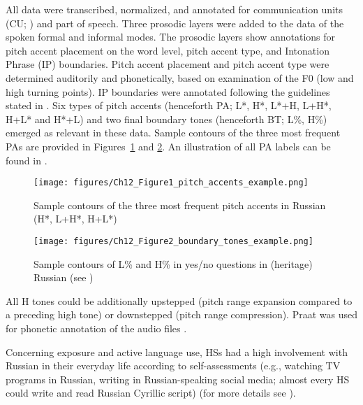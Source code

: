 \documentclass[output=paper,colorlinks,citecolor=brown]{langscibook}
\begin{document}
All data were transcribed, normalized, and annotated for communication units (CU; \cite{Hughes_McGillivray_Schmidek_1997}) and part of speech. Three prosodic layers were added to the data of the spoken formal and informal modes. The prosodic layers show annotations for pitch accent placement on the word level, pitch accent type, and Intonation Phrase (IP) boundaries. Pitch accent placement and pitch accent type were determined auditorily and phonetically, based on examination of the F0 (low and high turning points). IP boundaries were annotated following the guidelines stated in \citet{Himmelmann_Sandler_Strunk_Unterladstetter_2018}. Six types of pitch accents (henceforth PA; L*, H*, L*+H, L+H*, H+L* and H*+L) and two final boundary tones (henceforth BT; L\%, H\%) emerged as relevant in these data. Sample contours of the three most frequent PAs are provided in Figures~\ref{chapter12:fig:1} and \ref{chapter12:fig:2}. An illustration of all PA labels can be found in \citet{Zerbian_Zuban_Klotz_2024}.

\begin{figure}
  \centering
  \texttt{[image: figures/Ch12\_Figure1\_pitch\_accents\_example.png]}
  \caption{Sample contours of the three most frequent pitch accents in Russian (H*, L+H*, H+L*)}
  \label{chapter12:fig:1}
\end{figure}

\begin{figure}
  \centering
  \texttt{[image: figures/Ch12\_Figure2\_boundary\_tones\_example.png]}
  \caption{Sample contours of L\% and H\% in yes/no questions in (heritage) Russian (see )}
  \label{chapter12:fig:2}
\end{figure}

All H tones could be additionally upstepped (pitch range expansion compared to a preceding high tone) or downstepped (pitch range compression). Praat was used for phonetic annotation of the audio files \citep{Boersma2001}.

Concerning exposure and active language use, HSs had a high involvement with Russian in their everyday life according to self-assessments (e.g., watching TV programs in Russian, writing in Russian-speaking social media; almost every HS could write and read Russian Cyrillic script) (for more details see \cite{Zerbian_Barabashova_Zuban_subm, Zuban}).
\end{document}
